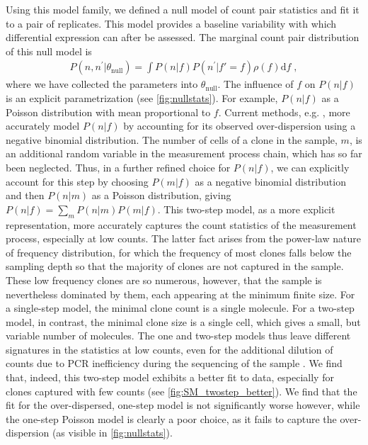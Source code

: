 \documentclass[letterpaper,english,prl,reprint,longbibliography]{revtex4-1} %
\begin{document}
Using this model family, we defined a null model of count pair statistics and fit it to a pair of replicates.
This model provides a baseline variability with which differential expression can after be assessed. 
The marginal count pair distribution of this null model is  
\begin{eqnarray}
	P(n,n^{\prime}|\theta_{\textrm{null}})=\int P(n|f)P(n^{\prime}|f'=f)\rho(f)\text{d}f\;,
\end{eqnarray}
where we have collected the parameters into $\theta_{\textrm{null}}$. 
The influence of $f$ on $P(n|f)$ is an explicit parametrization  (see \cref{fig:nullstats}). For example, $P(n|f)$ as a Poisson distribution with mean proportional to $f$. 
Current methods, e.g. \cite{Robinson2008}, more accurately model $P(n|f)$ by accounting for its observed over-dispersion using a negative binomial distribution. 
The number of cells of a clone in the sample, $m$, is an additional random variable in the measurement process chain, which has so far been neglected. 
Thus, in a further refined choice for $P(n|f)$, we can explicitly account for this step by choosing $P(m|f)$ as a negative binomial distribution and then $P(n|m)$ as a Poisson distribution, giving $P(n|f)=\sum_m P(n|m)P(m|f)$. 
This two-step model, as a more explicit representation, more accurately captures the count statistics of the measurement process, especially at low counts. 
The latter fact arises from the power-law nature of frequency distribution, for which the frequency of most clones falls below the sampling depth so that the majority of clones are not captured in the sample. 
These low frequency clones are so numerous, however, that the sample is nevertheless dominated by them, each appearing at the minimum finite size. 
For a single-step model, the minimal clone count is a single molecule. 
For a two-step model, in contrast, the minimal clone size is a single cell, which gives a small, but variable number of molecules. 
The one and two-step models thus leave different signatures in the statistics at low counts, even for the additional dilution of counts due to PCR inefficiency during the sequencing of the sample \citep{Best2015a}.
We find that, indeed, this two-step model exhibits a better fit to data, especially for clones captured with few counts (see \cref{fig:SM_twostep_better}). 
We find that the fit for the over-dispersed, one-step model is not significantly worse however, while the one-step Poisson model is clearly a poor choice, as it fails to capture the over-dispersion (as visible in \cref{fig:nullstats}).
\end{document}
